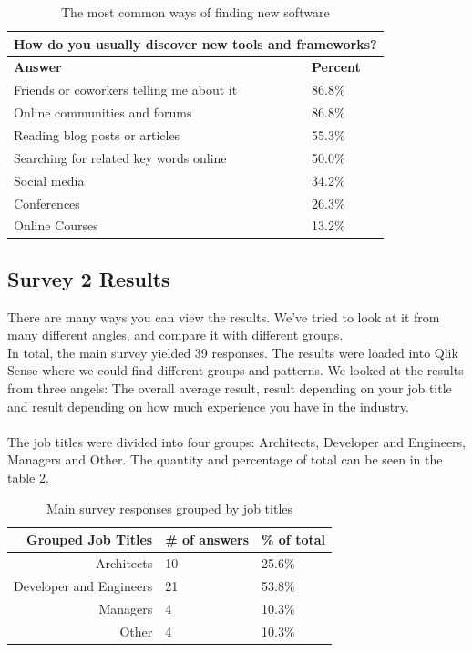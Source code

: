 \documentclass{article}
\begin{document}
\begin{table}[H]
\centering
\begin{tabularx}{\columnwidth}{X|l}
\multicolumn{2}{c}{\textbf{How do you usually discover new tools and frameworks?}} \\ \hline \hline
\textbf{Answer} & \textbf{Percent} \\ \hline
Friends or coworkers telling me about it	&	86.8\% \\
Online communities and forums	&	86.8\% \\
Reading blog posts or articles	&	55.3\% \\
Searching for related key words online	&	50.0\% \\
Social media	&	34.2\% \\
Conferences	&	26.3\% \\
Online Courses	&	13.2\% \\ \hline
\end{tabularx}
\caption{The most common ways of finding new software}
\label{tab:discover}
\end{table}

\subsection{Survey 2 Results}
There are many ways you can view the results. We've tried to look at it from many different angles, and compare it with different groups. \\
In total, the main survey yielded 39 responses. The results were loaded into Qlik Sense
where we could find different groups and patterns. We looked at the
results from three angels: The overall average result, result depending
on your job title and result depending on how much experience you have
in the industry.
\\ \\
The job titles were divided into four groups: Architects, Developer and
Engineers, Managers and Other. The quantity and percentage of total can
be seen in the table \ref{tabl:jobs}.

\begin{table}[H]
\centering
\begin{tabularx}{\columnwidth}{r l l}
\textbf{Grouped Job Titles} &    \textbf{\# of answers} &     \textbf{\% of total} \\\hline
Architects              & 10           & 25.6\%  \\ \hline
Developer and Engineers & 21           & 53.8\%  \\\hline
Managers                & 4            & 10.3\%  \\\hline
Other                   & 4            & 10.3\%  \\\hline
\end{tabularx}
\caption{Main survey responses grouped by job titles}
\label{tabl:jobs}
\end{table}
\end{document}

